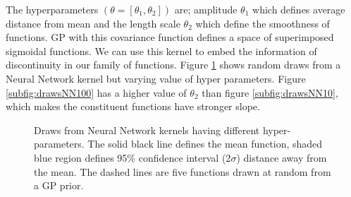 The hyperparameters \((\theta = [\theta_{1}, \theta_{2}])\) are; amplitude \(\theta_{1}\) which defines average distance from mean and the length scale \(\theta_{2}\) which define the smoothness of functions. GP with this covariance function defines a space of superimposed sigmoidal functions. We can use this kernel to embed the information of discontinuity in our family of functions. Figure \ref{figNNPrior} shows random draws from a Neural Network kernel but varying value of hyper parameters. Figure \ref{subfig:drawsNN100} has a higher value of \(\theta_{2}\) than figure \ref{subfig:drawsNN10}, which makes the constituent functions have stronger slope.

\begin{figure}[!ht]
  \centering
  \quad
    \quad
  \caption{Draws from Neural Network kernels having different hyper-parameters. The solid black line defines the mean function, shaded blue region defines 95\% confidence interval (2\(\sigma\)) distance away from the mean. The dashed lines are five functions drawn at random from a GP prior.}
  \label{figNNPrior}
\end{figure}

